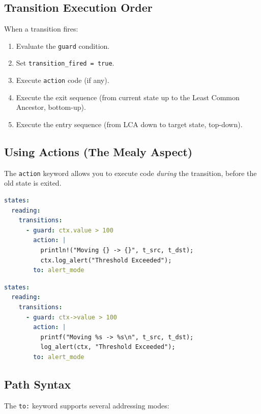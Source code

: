\documentclass[a4paper,11pt]{article}
\begin{document}
\subsection{Transition Execution Order}
When a transition fires:
\begin{enumerate}
    \item Evaluate the \texttt{guard} condition.
    \item Set \texttt{transition\_fired = true}.
    \item Execute \texttt{action} code (if any).
    \item Execute the exit sequence (from current state up to the Least Common Ancestor, bottom-up).
    \item Execute the entry sequence (from LCA down to target state, top-down).
\end{enumerate}

\subsection{Using Actions (The Mealy Aspect)}
The \texttt{action} keyword allows you to execute code \textit{during} the transition, before the old state is exited.

\begin{lstlisting}[language=YAML, caption={Rust example using action variables}]
states:
  reading:
    transitions:
      - guard: ctx.value > 100
        action: |
          println!("Moving {} -> {}", t_src, t_dst);
          ctx.log_alert("Threshold Exceeded");
        to: alert_mode
\end{lstlisting}

\begin{lstlisting}[language=YAML, caption={C example using action variables}]
states:
  reading:
    transitions:
      - guard: ctx->value > 100
        action: |
          printf("Moving %s -> %s\n", t_src, t_dst);
          log_alert(ctx, "Threshold Exceeded");
        to: alert_mode
\end{lstlisting}

\subsection{Path Syntax}
\label{sec:paths}
The \texttt{to:} keyword supports several addressing modes:
\end{document}
